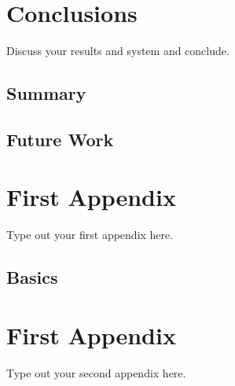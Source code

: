 \documentclass[a4paper,oneside,12pt]{report}
\begin{document}
\chapter{Conclusions}
\label{ch:summary}

Discuss your results and system and conclude.

\section{Summary}

\section{Future Work}

\appendix
\chapter{First Appendix}
Type out your first appendix here.
\section{Basics}

\chapter{First Appendix}
Type out your second appendix here.

% 
% 



\end{document}
